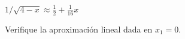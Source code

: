 \item $\displaystyle 1/\sqrt{4 - x} \approx \frac{1}{2} + \frac{1}{16}x$
\par
Verifique la aproximación lineal dada en $x_1 = 0$.
